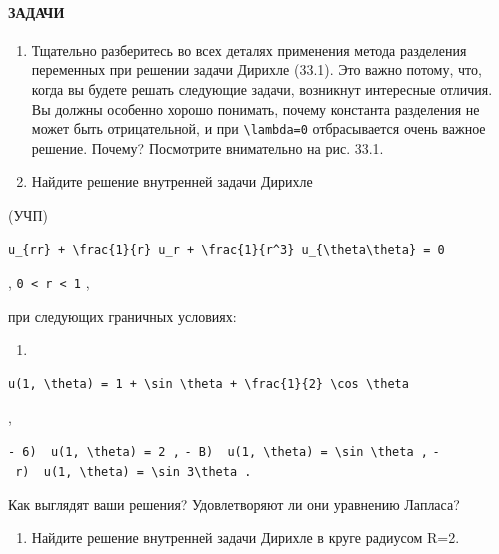 \documentclass[
  ukrainian,
]{article}
\providecommand{\tightlist}{%
  \setlength{\itemsep}{0pt}\setlength{\parskip}{0pt}}
\begin{document}
\paragraph{ЗАДАЧИ}\label{ux437ux430ux434ux430ux447ux438-8}

\begin{enumerate}
\def\labelenumi{\arabic{enumi}.}
\item
  Тщательно разберитесь во всех деталях применения метода разделения
  переменных при решении задачи Дирихле (33.1). Это важно потому, что,
  когда вы будете решать следующие задачи, возникнут интересные отличия.
  Вы должны особенно хорошо понимать, почему константа разделения не
  может быть отрицательной, и при \texttt{\textbackslash{}lambda=0}
  отбрасывается очень важное решение. Почему? Посмотрите внимательно на
  рис. 33.1.
\item
  Найдите решение внутренней задачи Дирихле
\end{enumerate}

(УЧП)

\begin{verbatim}
u_{rr} + \frac{1}{r} u_r + \frac{1}{r^3} u_{\theta\theta} = 0
\end{verbatim}

, \texttt{0\ \textless{}\ r\ \textless{}\ 1} ,

при следующих граничных условиях:

\begin{enumerate}
\def\labelenumi{\alph{enumi})}
\tightlist
\item
\end{enumerate}

\begin{verbatim}
u(1, \theta) = 1 + \sin \theta + \frac{1}{2} \cos \theta
\end{verbatim}

,

\texttt{-\ 6)\ \ \textquotesingle{}u(1,\ \textbackslash{}theta)\ =\ 2\textquotesingle{}\ ,}
\texttt{-\ B)\ \ \textquotesingle{}u(1,\ \textbackslash{}theta)\ =\ \textbackslash{}sin\ \textbackslash{}theta\textquotesingle{}\ ,}
\texttt{-\ r)\ \ \textquotesingle{}u(1,\ \textbackslash{}theta)\ =\ \textbackslash{}sin\ 3\textbackslash{}theta\textquotesingle{}\ .}

Как выглядят ваши решения? Удовлетворяют ли они уравнению Лапласа?

\begin{enumerate}
\def\labelenumi{\arabic{enumi}.}
\setcounter{enumi}{2}
\tightlist
\item
  Найдите решение внутренней задачи Дирихле в круге радиусом R=2.
\end{enumerate}
\end{document}
